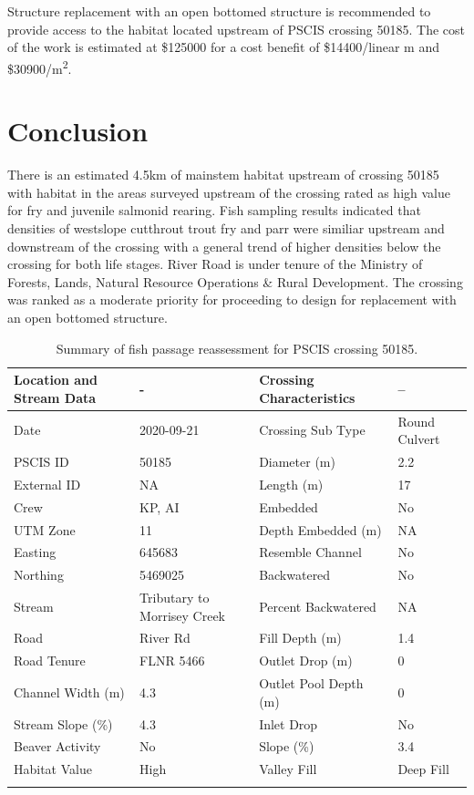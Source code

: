 \documentclass[
]{book}
\begin{document}
Structure replacement with an open bottomed structure is recommended to provide access to the habitat located upstream of PSCIS crossing 50185. The cost of the work is estimated at \$125000 for a cost benefit of \$14400/linear m and \$30900/m\textsuperscript{2}.

\hypertarget{conclusion-3}{%
\section*{Conclusion}\label{conclusion-3}}

There is an estimated 4.5km of mainstem habitat upstream of crossing 50185 with habitat in the areas surveyed upstream of the crossing rated as high value for fry and juvenile salmonid rearing. Fish sampling results indicated that densities of westslope cutthrout trout fry and parr were similiar upstream and downstream of the crossing with a general trend of higher densities below the crossing for both life stages. River Road is under tenure of the Ministry of Forests, Lands, Natural Resource Operations \& Rural Development. The crossing was ranked as a moderate priority for proceeding to design for replacement with an open bottomed structure.

\begin{table}

\caption{\label{tab:tab-culvert-030}Summary of fish passage reassessment for PSCIS crossing 50185.}
\centering
\fontsize{11}{13}\selectfont
\begin{tabu} to 
\toprule
Location and Stream Data & - & Crossing Characteristics & --\\
\midrule
Date & 2020-09-21 & Crossing Sub Type & Round Culvert\\
PSCIS ID & 50185 & Diameter (m) & 2.2\\
External ID & NA & Length (m) & 17\\
Crew & KP, AI & Embedded & No\\
UTM Zone & 11 & Depth Embedded (m) & NA\\
\addlinespace
Easting & 645683 & Resemble Channel & No\\
Northing & 5469025 & Backwatered & No\\
Stream & Tributary to Morrisey Creek & Percent Backwatered & NA\\
Road & River Rd & Fill Depth (m) & 1.4\\
Road Tenure & FLNR 5466 & Outlet Drop (m) & 0\\
\addlinespace
Channel Width (m) & 4.3 & Outlet Pool Depth (m) & 0\\
Stream Slope (\%) & 4.3 & Inlet Drop & No\\
Beaver Activity & No & Slope (\%) & 3.4\\
Habitat Value & High & Valley Fill & Deep Fill\\
\bottomrule
{}\\
\end{tabu}
\end{table}
\end{document}
